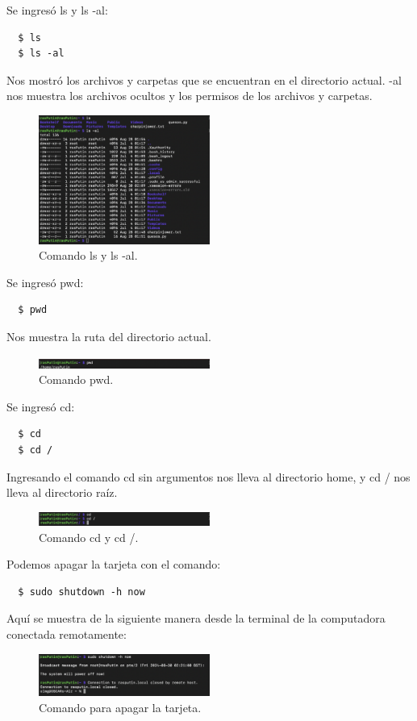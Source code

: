 \documentclass[12pt]{report}
\begin{document}
Se ingresó ls y ls -al:
\begin{verbatim}
  $ ls
  $ ls -al
\end{verbatim}
Nos mostró los archivos y carpetas que se encuentran en el directorio actual. -al nos muestra los archivos ocultos y los permisos de los archivos y carpetas.
\begin{figure}[H]
  \centering
  \includegraphics[width=0.5\textwidth]{Screenshots/ls.png}
  \caption{Comando ls y ls -al.}
  \label{fig: ls}
\end{figure}
Se ingresó pwd:
\begin{verbatim}
  $ pwd
\end{verbatim}
Nos muestra la ruta del directorio actual.
\begin{figure}[H]
  \centering
  \includegraphics[width=0.5\textwidth]{Screenshots/pwd.png}
  \caption{Comando pwd.}
  \label{fig:pwd}
\end{figure}
Se ingresó cd:
\begin{verbatim}
  $ cd 
  $ cd /
\end{verbatim}
Ingresando el comando cd sin argumentos nos lleva al directorio home, y cd / nos lleva al directorio raíz.
\begin{figure}[H]
  \centering
  \includegraphics[width=0.5\textwidth]{Screenshots/cd.png}
  \caption{Comando cd y cd /.}
  \label{fig:cd}
\end{figure}

Podemos apagar la tarjeta con el comando:
\begin{verbatim}
  $ sudo shutdown -h now
\end{verbatim}
Aquí se muestra de la siguiente manera desde la terminal de la computadora conectada remotamente:
\begin{figure}[H]
  \centering
  \includegraphics[width=0.5\textwidth]{Screenshots/apagando.png}
  \caption{Comando para apagar la tarjeta.}
  \label{fig:apagar}
\end{figure}
\end{document}
